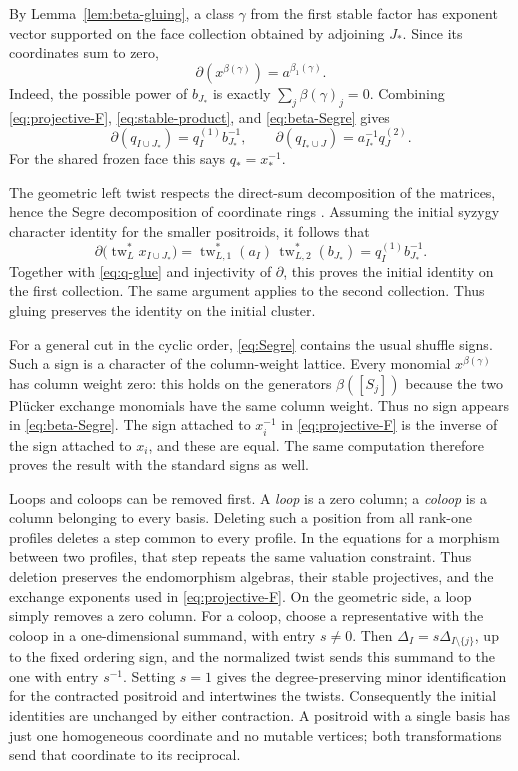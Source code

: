 \documentclass[11pt]{amsart}
\numberwithin{equation}{section}
\theoremstyle{definition}
\theoremstyle{remark}
\newcommand{\op}[1]{\operatorname{#1}}
\newcommand{\tw}{\op{tw}}
\begin{document}
By Lemma~\ref{lem:beta-gluing}, a class $\gamma$ from the first stable
factor has exponent vector supported on the face collection obtained by adjoining $J_*$.
Since its coordinates sum to zero,
\begin{equation}\label{eq:beta-Segre} \partial(x^{\beta(\gamma)})=a^{\beta_1(\gamma)}.\end{equation}
Indeed, the possible power of $b_{J_*}$ is exactly
$\sum_j\beta(\gamma)_j=0$. Combining
\eqref{eq:projective-F}, \eqref{eq:stable-product}, and
\eqref{eq:beta-Segre} gives
\begin{equation}\label{eq:q-glue} \partial(q_{I\cup J_*})=q_I^{(1)}b_{J_*}^{-1},\qquad \partial(q_{I_*\cup J})=a_{I_*}^{-1}q_J^{(2)}.\end{equation}
For the shared frozen face this says $q_* =x_*^{-1}$.

The geometric left twist respects the direct-sum decomposition of the
matrices, hence the Segre decomposition of coordinate rings
\cite[Proposition~4.20 and Corollary~4.21]{Pre}. Assuming the initial
syzygy character identity for the smaller positroids, it follows that
\[ \partial\bigl(\tw_L^*x_{I\cup J_*}\bigr) =\tw_{L,1}^*(a_I)\,\tw_{L,2}^*(b_{J_*}) =q_I^{(1)}b_{J_*}^{-1}. \]
Together with \eqref{eq:q-glue} and injectivity of $\partial$, this
proves the initial identity on the first collection. The same argument applies to the second collection. Thus gluing preserves
the identity on the initial cluster.

For a general cut in the cyclic order, \eqref{eq:Segre} contains the
usual shuffle signs. Such a sign is a character of the column-weight
lattice. Every monomial $x^{\beta(\gamma)}$ has column weight zero: this
holds on the generators $\beta([S_j])$ because the two Pl\"ucker
exchange monomials have the same column weight. Thus no sign appears
in \eqref{eq:beta-Segre}. The sign attached to $x_i^{-1}$ in
\eqref{eq:projective-F} is the inverse of the sign attached to $x_i$,
and these are equal. The same computation therefore proves the result
with the standard signs as well.

Loops and coloops can be removed first. A \emph{loop} is a zero column;
a \emph{coloop} is a column belonging to every basis. Deleting such a position
from all rank-one profiles deletes a step common to every profile.
In the equations for a morphism between two profiles, that step repeats
the same valuation constraint. Thus deletion preserves the endomorphism
algebras, their stable projectives, and the exchange exponents used in
\eqref{eq:projective-F}. On the geometric side, a loop simply removes a
zero column. For a coloop, choose a representative with the coloop in a
one-dimensional summand, with entry $s\ne0$. Then
$\Delta_I=s\Delta_{I\setminus\{j\}}$, up to the fixed ordering sign,
and the normalized twist sends this summand to the one with entry
$s^{-1}$. Setting $s=1$ gives the degree-preserving minor
identification for the contracted positroid and intertwines the twists.
Consequently the initial identities are unchanged by either contraction.
A positroid with a single basis has just one homogeneous coordinate and
no mutable vertices; both transformations send that coordinate to its reciprocal.
\end{document}
